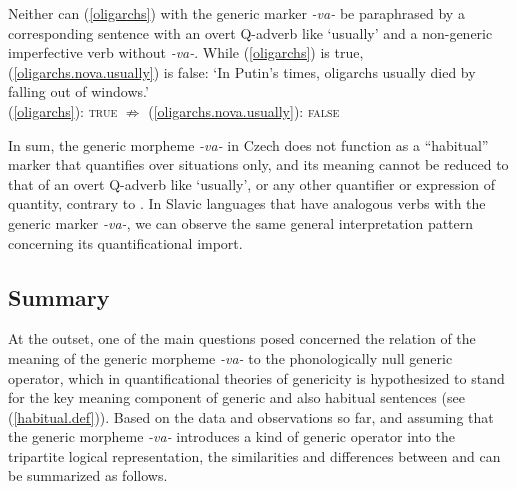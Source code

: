 \documentclass[output=paper,colorlinks,citecolor=brown]{langscibook}
\begin{document}
\noindent Neither can (\ref{oligarchs}) with the generic marker \textit{-va-} be paraphrased by a corresponding sentence with an overt Q-adverb like `usually'
and a non-generic imperfective verb without \textit{-va-}. While
(\ref{oligarchs}) is true, (\ref{oligarchs.nova.usually}) is false:
\glt `In Putin's times,  oligarchs usually died by falling out of windows.'\\
(\ref{oligarchs}): \textsc{true} $\nRightarrow$ (\ref{oligarchs.nova.usually}): \textsc{false}
\z

\noindent In sum, the generic morpheme \textit{-va-} in Czech does not function as a ``habitual'' marker that quantifies over situations only, and its meaning cannot be reduced  to that of an overt Q-adverb like `usually',
or any other quantifier or expression of quantity,
contrary to \citet{dahl1995}. In Slavic languages that have
analogous verbs with the generic marker \textit{-va-}, we can
observe the same general interpretation pattern concerning its
quantificational import.


\subsection{Summary}


At the outset, one of the main questions posed
concerned the relation of
the meaning of the generic morpheme \textit{-va-} to the phonologically null generic  operator, which in quantificational theories of genericity is hypothesized to stand for the key meaning
component of generic and also habitual sentences
(see (\ref{habitual.def})).
Based on the data and observations so far, and
assuming that the generic morpheme \textit{-va-} introduces a kind of generic operator  into the tripartite logical representation, the similarities and differences between  and  can be summarized as follows.
\end{document}
